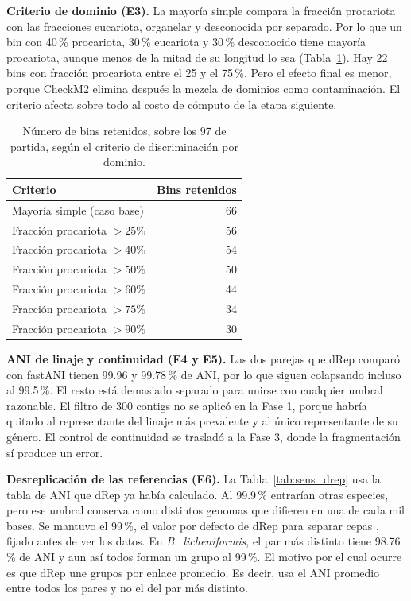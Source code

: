 \textbf{Criterio de dominio (E3).} La mayoría simple compara la fracción
procariota con las fracciones eucariota, organelar y desconocida por separado.
Por lo que un bin con 40\,\% procariota, 30\,\% eucariota y 30\,\% desconocido
tiene mayoría procariota, aunque menos de la mitad de su longitud lo sea
(Tabla~\ref{tab:sensibilidad_dominio}). Hay 22 bins con fracción procariota
entre el 25 y el 75\,\%. Pero el efecto final es menor, porque CheckM2 elimina
después la mezcla de dominios como contaminación. El criterio afecta sobre todo
al costo de cómputo de la etapa siguiente.

\begin{table}[H]
\centering
\small
\caption[Sensibilidad del criterio de dominio]{Número de bins retenidos, sobre
los 97 de partida, según el criterio de discriminación por dominio.}
\label{tab:sensibilidad_dominio}
\begin{tabular}{lr}
\toprule
\textbf{Criterio} & \textbf{Bins retenidos} \\
\midrule
Mayoría simple (caso base)        & 66 \\
Fracción procariota $> 25\%$      & 56 \\
Fracción procariota $> 40\%$      & 54 \\
Fracción procariota $> 50\%$      & 50 \\
Fracción procariota $> 60\%$      & 44 \\
Fracción procariota $> 75\%$      & 34 \\
Fracción procariota $> 90\%$      & 30 \\
\bottomrule
\end{tabular}
\end{table}

\textbf{ANI de linaje y continuidad (E4 y E5).} Las dos parejas que dRep
comparó con fastANI tienen 99.96 y 99.78\,\% de ANI, por lo que siguen
colapsando incluso al 99.5\,\%. El resto está demasiado separado para unirse con
cualquier umbral razonable. El filtro de 300 contigs no se aplicó en la Fase 1,
porque habría quitado al representante del linaje más prevalente y al único
representante de su género. El control de continuidad se trasladó a la Fase 3,
donde la fragmentación sí produce un error.

\textbf{Desreplicación de las referencias (E6).} La Tabla~\ref{tab:sens_drep}
usa la tabla de ANI que dRep ya había calculado. Al 99.9\,\% entrarían otras
especies, pero ese umbral conserva como distintos genomas que difieren en una de
cada mil bases. Se mantuvo el 99\,\%, el valor por defecto de dRep para separar
cepas \cite{olm2017}, fijado antes de ver los datos. En
\textit{B.~licheniformis}, el par más distinto tiene 98.76\,\% de ANI y aun así
todos forman un grupo al 99\,\%. El motivo por el cual ocurre es que dRep une
grupos por enlace promedio. Es decir, usa el ANI promedio entre todos los pares
y no el del par más distinto.

